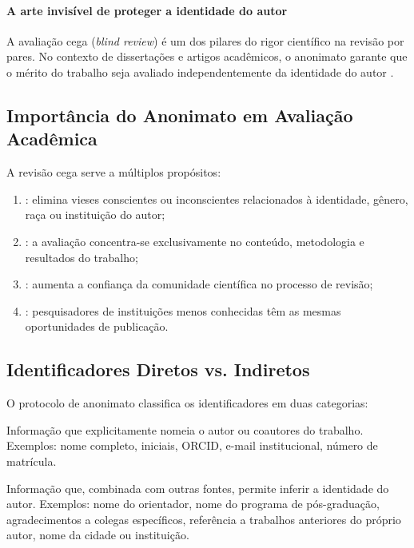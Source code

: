 \paragraph{A arte invisível de proteger a identidade do autor} A avaliação cega (\textit{blind review}) é um dos pilares do rigor científico
na revisão por pares. No contexto de dissertações e artigos acadêmicos, o
anonimato garante que o mérito do trabalho seja avaliado independentemente da
identidade do autor \cite{popper2005logica, kuhn1998estrutura}.

\subsection{Importância do Anonimato em Avaliação Acadêmica}

A revisão cega serve a múltiplos propósitos:

\begin{enumerate}
\item {}: elimina vieses conscientes ou inconscientes
      relacionados à identidade, gênero, raça ou instituição do autor;
\item {}: a avaliação concentra-se exclusivamente no
      conteúdo, metodologia e resultados do trabalho;
\item {}: aumenta a confiança da comunidade científica no
      processo de revisão;
\item {}: pesquisadores de instituições menos conhecidas têm
      as mesmas oportunidades de publicação.
\end{enumerate}

\subsection{Identificadores Diretos vs. Indiretos}

O protocolo de anonimato classifica os identificadores em duas categorias:

\begin{definicao}
Informação que explicitamente nomeia o autor ou coautores do trabalho.
Exemplos: nome completo, iniciais, ORCID, e-mail institucional, número de
matrícula.
\end{definicao}

\begin{definicao}
Informação que, combinada com outras fontes, permite inferir a identidade do
autor. Exemplos: nome do orientador, nome do programa de pós-graduação,
agradecimentos a colegas específicos, referência a trabalhos anteriores do
próprio autor, nome da cidade ou instituição.
\end{definicao}

